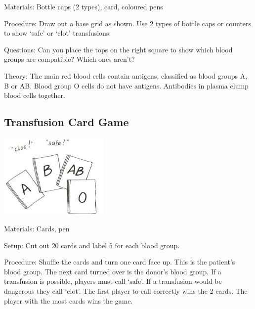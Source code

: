 \begin{multicols}{2}
\begin{description*}
\item[Materials:]{Bottle caps (2 types), card, coloured pens}
\item[Procedure:]{Draw out a base grid as shown. Use 2 types of bottle caps or counters to
show `safe' or `clot' transfusions.}
\item[Questions:]{Can you place the tops on the right square to show which blood groups are compatible?
Which ones aren't?}
\item[Theory:]{The main red blood cells contain antigens, classified as blood groups A, B or AB. Blood
group O cells do not have antigens. Antibodies in plasma clump blood cells together.}
\end{description*}

\subsection{Transfusion Card Game}

\begin{center}
\includegraphics[width=0.4\textwidth]{./img/vso/transfusion-card.jpg}
\end{center}

\begin{description*}
\item[Materials:]{Cards, pen}
\item[Setup:]{Cut out 20 cards and label 5 for each blood group. }
\item[Procedure:]{Shuffle the cards and turn one card face up.
This is the patient's blood group. The next card turned over is the
donor's blood group. If a transfusion is possible, players must call `safe'.
If a transfusion would be dangerous they call `clot'. The first player to
call correctly wins the 2 cards. The player with the most cards wins the game.}
\end{description*}


\end{multicols}

